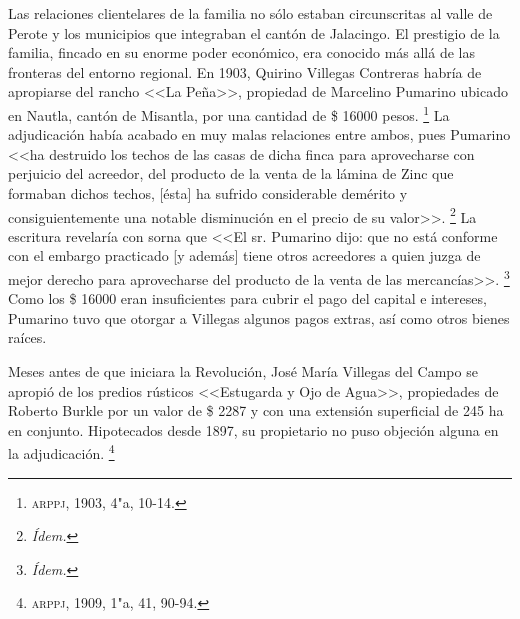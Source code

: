 \documentclass[14pt,twoside,final]{extbook} %
\let\oldfootnote\footnote
\renewcommand\footnote[1]{%
\oldfootnote{\hspace{1mm}#1}}
\begin{document}
Las relaciones clientelares de la familia no sólo estaban circunscritas al valle de Perote y los municipios que integraban el cantón de Jalacingo. El prestigio de la familia, fincado en su enorme poder económico, era conocido más allá de las fronteras del entorno regional. En 1903, Quirino Villegas Contreras habría de apropiarse del rancho <<La Peña>>, propiedad de Marcelino Pumarino ubicado en Nautla, cantón de Misantla, por una cantidad de \$ 16000 pesos.\footnote{\textsc{arppj}, 1903, 4"a, 10-14.} La adjudicación había acabado en muy malas relaciones entre ambos, pues Pumarino <<ha destruido los techos de las casas de dicha finca para aprovecharse con perjuicio del acreedor, del producto de la venta de la lámina de Zinc que formaban dichos techos, [ésta] ha sufrido considerable demérito y consiguientemente una notable disminución en el precio de su valor>>.\footnote{\em Ídem.} La escritura revelaría con sorna que <<El sr. Pumarino dijo: que no está conforme con el embargo practicado [y además] tiene otros acreedores a quien juzga de mejor derecho
para aprovecharse del producto de la venta de las mercancías>>.\footnote{\em Ídem.} Como los \$ 16000 eran insuficientes para cubrir el pago del capital e intereses, Pumarino tuvo que otorgar a Villegas algunos pagos extras, así como otros bienes raíces.

Meses antes de que iniciara la Revolución, José María Villegas del Campo se apropió de los predios rústicos <<Estugarda y Ojo de Agua>>, propiedades de Roberto Burkle por un valor de \$ 2287 y con una extensión superficial de 245 ha en conjunto. Hipotecados desde 1897, su propietario no puso objeción alguna en la adjudicación.\footnote{\textsc{arppj}, 1909, 1"a, 41, 90-94.}
\end{document}
